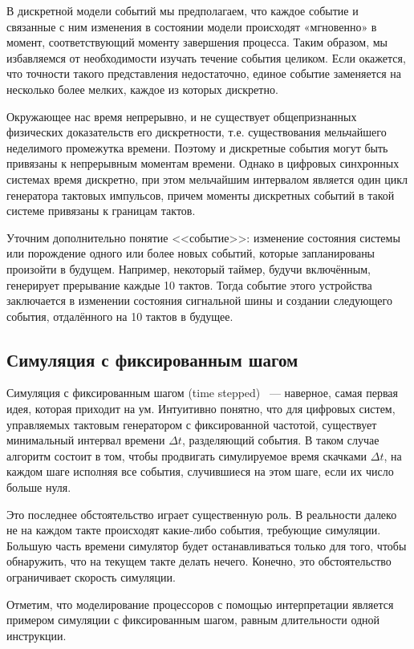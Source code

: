 В дискретной модели событий мы предполагаем, что каждое событие и связанные с ним изменения в состоянии модели происходят «мгновенно» в момент, соответствующий моменту завершения процесса. Таким образом, мы избавляемся от необходимости изучать течение события целиком. Если окажется, что точности такого представления недостаточно, единое событие заменяется на несколько более мелких, каждое из которых дискретно.

Окружающее нас время непрерывно, и не существует общепризнанных физических доказательств его дискретности, т.е. существования мельчайшего неделимого промежутка времени. Поэтому и дискретные события могут быть привязаны к непрерывным моментам времени. Однако в цифровых синхронных системах время дискретно, при этом мельчайшим интервалом является один цикл генератора тактовых импульсов, причем моменты дискретных событий в такой системе привязаны к границам тактов.

Уточним дополнительно понятие <<событие>>: изменение состояния системы или порождение одного или более новых событий, которые запланированы произойти в будущем. Например, некоторый таймер, будучи включённым, генерирует прерывание каждые 10 тактов. Тогда событие этого устройства заключается в изменении состояния сигнальной шины и создании следующего события, отдалённого на 10 тактов в будущее.

\subsection{Симуляция с фиксированным шагом}

Симуляция с фиксированным шагом (\abbr time stepped)~\cite{ferscha-1995-pdes} --- наверное, самая первая идея, которая приходит на ум. Интуитивно понятно, что для цифровых систем, управляемых тактовым генератором с фиксированной частотой, существует минимальный интервал времени $\Delta t$, разделяющий события. В таком случае алгоритм состоит в том, чтобы продвигать симулируемое время скачками $\Delta t$, на каждом шаге исполняя все события, случившиеся на этом шаге, если их число больше нуля.

Это последнее обстоятельство играет существенную роль. В реальности далеко не на каждом такте происходят какие-либо события, требующие симуляции. Большую часть времени симулятор будет останавливаться только для того, чтобы обнаружить, что на текущем такте делать нечего. Конечно, это обстоятельство ограничивает скорость симуляции.

Отметим, что моделирование процессоров с помощью интерпретации является примером симуляции с фиксированным шагом, равным длительности одной инструкции.

